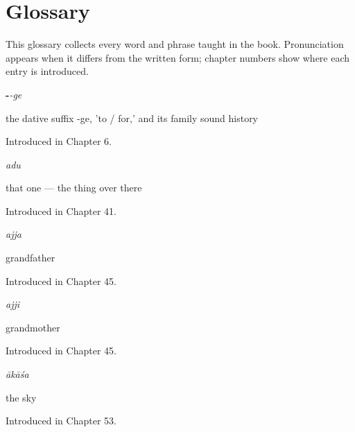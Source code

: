 
\chapter*{Glossary}

This glossary collects every word and phrase taught in the book. Pronunciation appears when it differs from the written form; chapter numbers show where each entry is introduced.

\noindent\begin{minipage}[t]{\linewidth}
\raggedright
\textbf{-}\enspace\emph{-ge}\par
\small the dative suffix -ge, 'to / for,' and its family sound history\par
\footnotesize Introduced in Chapter 6.
\end{minipage}\par\medskip

\noindent\begin{minipage}[t]{\linewidth}
\raggedright
\textbf{}\enspace\emph{adu}\par
\small that one — the thing over there\par
\footnotesize Introduced in Chapter 41.
\end{minipage}\par\medskip

\noindent\begin{minipage}[t]{\linewidth}
\raggedright
\textbf{}\enspace\emph{ajja}\par
\small grandfather\par
\footnotesize Introduced in Chapter 45.
\end{minipage}\par\medskip

\noindent\begin{minipage}[t]{\linewidth}
\raggedright
\textbf{}\enspace\emph{ajji}\par
\small grandmother\par
\footnotesize Introduced in Chapter 45.
\end{minipage}\par\medskip

\noindent\begin{minipage}[t]{\linewidth}
\raggedright
\textbf{}\enspace\emph{ākāśa}\par
\small the sky\par
\footnotesize Introduced in Chapter 53.
\end{minipage}\par\medskip

